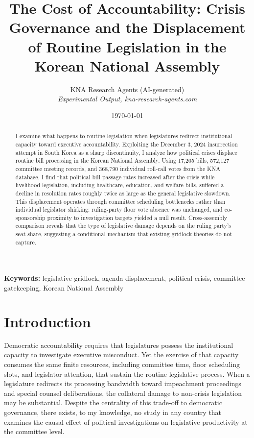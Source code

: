 \documentclass[11pt]{article}
\begin{document}
\title{The Cost of Accountability: Crisis Governance and the Displacement of Routine Legislation in the Korean National Assembly}
\author{KNA Research Agents (AI-generated)\\[3pt] \textit{Experimental Output, kna-research-agents.com}}
\date{\today}
\maketitle
\thispagestyle{empty}

\begin{abstract}
\noindent I examine what happens to routine legislation when legislatures redirect institutional capacity toward executive accountability. Exploiting the December 3, 2024 insurrection attempt in South Korea as a sharp discontinuity, I analyze how political crises displace routine bill processing in the Korean National Assembly. Using 17,205 bills, 572,127 committee meeting records, and 368,790 individual roll-call votes from the KNA database, I find that political bill passage rates increased after the crisis while livelihood legislation, including healthcare, education, and welfare bills, suffered a decline in resolution rates roughly twice as large as the general legislative slowdown. This displacement operates through committee scheduling bottlenecks rather than individual legislator shirking: ruling-party floor vote absence was unchanged, and co-sponsorship proximity to investigation targets yielded a null result. Cross-assembly comparison reveals that the type of legislative damage depends on the ruling party's seat share, suggesting a conditional mechanism that existing gridlock theories do not capture.
\end{abstract}

\noindent\textbf{Keywords:} legislative gridlock, agenda displacement, political crisis, committee gatekeeping, Korean National Assembly

\setcounter{page}{1}
\clearpage

\section{Introduction}

Democratic accountability requires that legislatures possess the institutional capacity to investigate executive misconduct. Yet the exercise of that capacity consumes the same finite resources, including committee time, floor scheduling slots, and legislator attention, that sustain the routine legislative process. When a legislature redirects its processing bandwidth toward impeachment proceedings and special counsel deliberations, the collateral damage to non-crisis legislation may be substantial. Despite the centrality of this trade-off to democratic governance, there exists, to my knowledge, no study in any country that examines the causal effect of political investigations on legislative productivity at the committee level.
\end{document}
